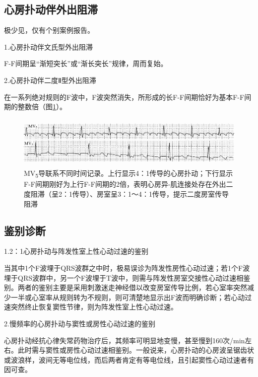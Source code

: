 \protect\hypertarget{text00020.htmlux5cux23subid196}{}{}

\subsection{心房扑动伴外出阻滞}

极少见，仅有个别案例报告。

1.心房扑动伴文氏型外出阻滞

F-F间期呈“渐短突长”或“渐长突长”规律，周而复始。

2.心房扑动伴二度Ⅱ型外出阻滞

在一系列绝对规则的F波中，F波突然消失，所形成的长F-F间期恰好为基本F-F间期的整数倍（图\ref{fig13-13}）。

\begin{figure}[!htbp]
 \centering
 \includegraphics[width=5.58333in,height=1in]{./images/Image00221.jpg}
 \captionsetup{justification=centering}
 \caption{MV\textsubscript{5}导联系不同时间记录。上行显示4：1传导的心房扑动；下行显示F-F间期刚好为上行F-F间期的2倍，表明心房异-肌连接处存在外出二度阻滞（呈2：1传导）、房室呈3：1～4：1传导，提示二度房室传导阻滞}
 \label{fig13-13}
  \end{figure} 


\protect\hypertarget{text00020.htmlux5cux23subid197}{}{}

\subsection{鉴别诊断}

1.2：1心房扑动与阵发性室上性心动过速的鉴别

当其中1个F波埋于QRS波群之中时，极易误诊为阵发性房性心动过速；若1个F波埋于QRS波群中，另一个F波埋于T波中，则需与阵发性房室交接性心动过速相鉴别。两者的鉴别主要是采用刺激迷走神经借以改变房室传导比例，若心室率突然减少一半或心室率从规则转为不规则，则可清楚地显示出F波而明确诊断；若心动过速突然终止恢复窦性节律，则为阵发性室上性心动过速。

2.慢频率的心房扑动与窦性或房性心动过速的鉴别

心房扑动经抗心律失常药物治疗后，其频率可明显地变慢，甚至慢到160次/min左右。此时需与窦性或房性心动过速相鉴别。一般说来，心房扑动的心房波呈锯齿状或波浪样，波间无等电位线，而后两者肯定有等电位线，且引起窦性心动过速者有因可查。

